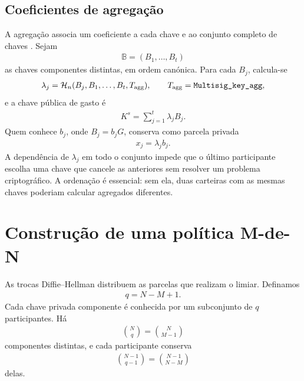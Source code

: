 \subsection{Coeficientes de agregação}
\label{sec:robust-key-aggregation}

A agregação associa um coeficiente a cada chave e ao
conjunto completo de chaves \cite{MRL-0009-multisig}. Sejam
\begin{align*}
 \mathbb B=(B_1,\ldots,B_t)
\end{align*}
as chaves componentes distintas, em ordem canónica. Para cada \(B_j\),
calcula-se
\begin{align*}
 \lambda_j
   =\mathcal H_n(B_j,B_1,\ldots,B_t,T_{\rm agg}),
 \qquad
 T_{\rm agg}=\texttt{Multisig\_key\_agg},
\end{align*}
e a chave pública de gasto é
\begin{align}
 K^s=\sum_{j=1}^{t}\lambda_jB_j.
 \label{eq:multisig-weighted-aggregate}
\end{align}
Quem conhece \(b_j\), onde \(B_j=b_jG\), conserva como parcela privada
\begin{align*}
 x_j=\lambda_jb_j.
\end{align*}
A dependência de \(\lambda_j\) em todo o conjunto impede que o último
participante escolha uma chave que cancele as anteriores sem resolver um
problema criptográfico. A ordenação é essencial: sem ela, duas carteiras com
as mesmas chaves poderiam calcular agregados diferentes.

\section{Construção de uma política M-de-N}
\label{sec:m-of-n}

As trocas Diffie--Hellman distribuem as parcelas que realizam o limiar.
Definamos
\begin{align}
 q=N-M+1.
 \label{eq:multisig-share-group-size}
\end{align}
Cada chave privada componente é conhecida por um subconjunto de \(q\)
participantes. Há
\begin{align*}
 \binom Nq=\binom N{M-1}
\end{align*}
componentes distintas, e cada participante conserva
\begin{align*}
 \binom{N-1}{q-1}=\binom{N-1}{N-M}
\end{align*}
delas.

